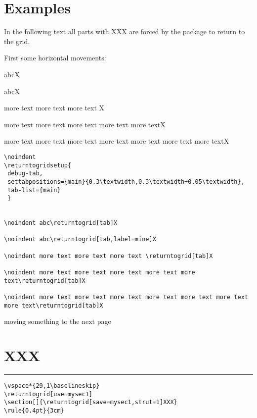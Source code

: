 \documentclass[twoside,parskip=half-,fontsize=12pt,egregdoesnotlikesansseriftitles,headings=normal]{scrartcl}
\begin{document}
\newpage
\section{Examples}

\returntogrid In the following text all parts with XXX are forced by the package to return to the grid.

First some horizontal movements:

\noindent
{}


\noindent abc\returntogrid[tab]X

\noindent abc\returntogrid[tab,label=mine]X

\noindent more text more text more text \returntogrid[tab]X

\noindent more text more text more text more text more text\returntogrid[tab]X

\noindent more text more text more text more text more text more text more text\returntogrid[tab]X


\begin{lstlisting}[breaklines]
\noindent
\returntogridsetup{
 debug-tab,
 settabpositions={main}{0.3\textwidth,0.3\textwidth+0.05\textwidth},
 tab-list={main}
 }


\noindent abc\returntogrid[tab]X

\noindent abc\returntogrid[tab,label=mine]X

\noindent more text more text more text \returntogrid[tab]X

\noindent more text more text more text more text more text\returntogrid[tab]X

\noindent more text more text more text more text more text more text more text\returntogrid[tab]X
\end{lstlisting}


\newpage
\AddToShipoutPictureBG {\AtTextUpperLeft{\showdebugpagegrid}}
moving something to the next page
\vspace*{29,1\baselineskip}
\returntogrid[use=mysec1]
\section[]{\returntogrid[save=mysec1,strut=1]XXX}
\rule{0.4pt}{3cm}




\begin{lstlisting}
\vspace*{29,1\baselineskip}
\returntogrid[use=mysec1]
\section[]{\returntogrid[save=mysec1,strut=1]XXX}
\rule{0.4pt}{3cm}
\end{lstlisting}
\end{document}
